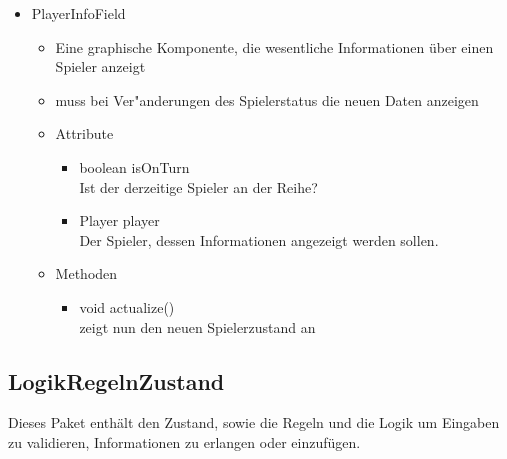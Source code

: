 \documentclass[a4paper,10pt]{article}
\begin{document}
\begin{itemize}
\item PlayerInfoField
\begin{itemize}
\item Eine graphische Komponente, die wesentliche Informationen über einen Spieler anzeigt
\item muss bei Ver"anderungen des Spielerstatus die neuen Daten anzeigen
\item Attribute
\begin{itemize}
\item boolean isOnTurn
\\Ist der derzeitige Spieler an der Reihe?
\item Player player
\\Der Spieler, dessen Informationen angezeigt werden sollen.
\end{itemize}
\item Methoden
\begin{itemize}
\item void actualize()
\\zeigt nun den neuen Spielerzustand an
\end{itemize}
\end{itemize}


\end{itemize}


\subsection{LogikRegelnZustand}

Dieses Paket enthält den Zustand, sowie die Regeln und die Logik um Eingaben zu validieren, Informationen zu erlangen oder einzufügen.
\end{document}
